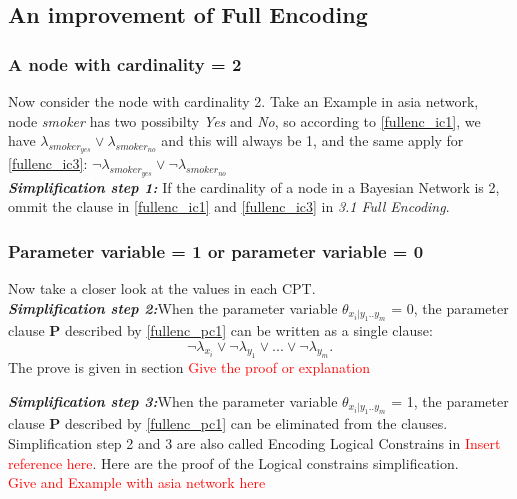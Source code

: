 \subsection{An improvement of Full Encoding}
\subsubsection{A node with cardinality = 2}
Now consider the node with cardinality 2. Take an Example in asia network, node \textit{smoker} has two possibilty \textit{Yes} and \textit{No}, so according to \ref{fullenc_ic1}, we have $\lambda_{smoker_{yes}} \vee \lambda_{smoker_{no}}$ and this will always be 1, and the same apply for \ref{fullenc_ic3}: $\neg\lambda_{smoker_{yes}} \vee \neg\lambda_{smoker_{no}}$\\
\textit{\textbf{Simplification step 1:}} If the cardinality of a node in a Bayesian Network is 2, ommit the clause in \ref{fullenc_ic1} and \ref{fullenc_ic3} in \textit{3.1 Full Encoding}.

\subsubsection{Parameter variable = 1 or parameter variable = 0}
Now take a closer look at the values in each CPT. \\

\textit{\textbf{Simplification step 2:}}When the parameter variable $\theta_{x_{i}|y_{1}..y_{m}}$ = 0, the parameter clause \textbf{P} described by \ref{fullenc_pc1} can be written as a single clause: $$\neg\lambda_{x_{i}} \vee \neg\lambda_{y_{1}} \vee... \vee \neg\lambda_{y_{m}}.$$
The prove is given in section \textcolor{red}{Give the proof or explanation}

\textit{\textbf{Simplification step 3:}}When the parameter variable $\theta_{x_{i}|y_{1}..y_{m}}$ = 1, the parameter clause \textbf{P} described by \ref{fullenc_pc1} can be eliminated from the clauses.\\

Simplification step 2 and 3 are also called Encoding Logical Constrains in \textcolor{red}{Insert reference here}. Here are the proof of the Logical constrains simplification.\\
\textcolor{red}{Give and Example with asia network here}

